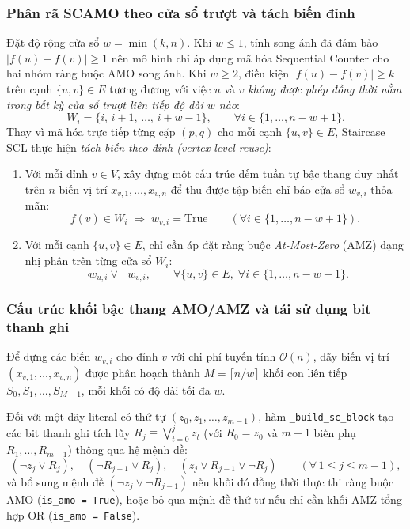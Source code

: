 \documentclass[a4paper,fleqn]{cas-sc}
\begin{document}
\subsubsection{Phân rã SCAMO theo cửa sổ trượt và tách biến đỉnh}
Đặt độ rộng cửa sổ $w = \min(k, n)$. Khi $w \le 1$, tính song ánh đã đảm bảo $|f(u) - f(v)| \ge 1$ nên mô hình chỉ áp dụng mã hóa Sequential Counter cho hai nhóm ràng buộc AMO song ánh. Khi $w \ge 2$, điều kiện $|f(u) - f(v)| \ge k$ trên cạnh $\{u, v\} \in E$ tương đương với việc $u$ và $v$ \emph{không được phép đồng thời nằm trong bất kỳ cửa sổ trượt liên tiếp độ dài $w$ nào}:
\begin{equation}
W_i = \{i,\, i + 1,\, \dots,\, i + w - 1\}, \qquad \forall i \in \{1, \dots, n - w + 1\}.
\end{equation}
Thay vì mã hóa trực tiếp từng cặp $(p, q)$ cho mỗi cạnh $\{u, v\} \in E$, Staircase SCL thực hiện \emph{tách biến theo đỉnh (vertex-level reuse)}:
\begin{enumerate}
    \item Với mỗi đỉnh $v \in V$, xây dựng một cấu trúc đếm tuần tự bậc thang duy nhất trên $n$ biến vị trí $x_{v,1}, \dots, x_{v,n}$ để thu được tập biến chỉ báo cửa sổ $w_{v, i}$ thỏa mãn:
    \[
    f(v) \in W_i \;\Longrightarrow\; w_{v, i} = \text{True} \qquad (\forall i \in \{1, \dots, n - w + 1\}).
    \]
    \item Với mỗi cạnh $\{u, v\} \in E$, chỉ cần áp đặt ràng buộc \textit{At-Most-Zero} (AMZ) dạng nhị phân trên từng cửa sổ $W_i$:
    \begin{equation}
    \neg w_{u, i} \lor \neg w_{v, i}, \qquad \forall \{u, v\} \in E,\; \forall i \in \{1, \dots, n - w + 1\}.
    \end{equation}
\end{enumerate}

\subsubsection{Cấu trúc khối bậc thang AMO/AMZ và tái sử dụng bit thanh ghi}
Để dựng các biến $w_{v, i}$ cho đỉnh $v$ với chi phí tuyến tính $\mathcal{O}(n)$, dãy biến vị trí $(x_{v,1}, \dots, x_{v,n})$ được phân hoạch thành $M = \lceil n / w \rceil$ khối con liên tiếp $S_0, S_1, \dots, S_{M-1}$, mỗi khối có độ dài tối đa $w$.

Đối với một dãy literal có thứ tự $(z_0, z_1, \dots, z_{m-1})$, hàm \texttt{\_build\_sc\_block} tạo các bit thanh ghi tích lũy $R_j \equiv \bigvee_{t=0}^j z_t$ (với $R_0 = z_0$ và $m - 1$ biến phụ $R_1, \dots, R_{m-1}$) thông qua hệ mệnh đề:
\begin{equation}
(\neg z_j \lor R_j), \quad (\neg R_{j-1} \lor R_j), \quad (z_j \lor R_{j-1} \lor \neg R_j) \qquad (\forall\, 1 \le j \le m - 1),
\end{equation}
và bổ sung mệnh đề $(\neg z_j \lor \neg R_{j-1})$ nếu khối đó đồng thời thực thi ràng buộc AMO (\texttt{is\_amo = True}), hoặc bỏ qua mệnh đề thứ tư nếu chỉ cần khối AMZ tổng hợp OR (\texttt{is\_amo = False}).
\end{document}
